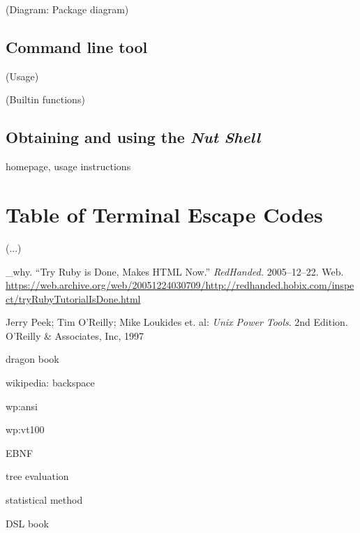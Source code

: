 \documentclass[paper=a4,twoside,abstract=on,cleardoublepage=empty,numbers=noenddot,toc=bib,12pt,appendixprefix=true]{scrreprt}
\begin{document}
(Diagram: Package diagram)

\section{Command line tool}

(Usage)

(Builtin functions)

\section{Obtaining and using the \emph{Nut Shell}}

homepage, usage instructions

\chapter{Table of Terminal Escape Codes}
\label{sec:esc}

(...)

\begin{thebibliography}{99}
        \_why. “Try Ruby is Done, Makes HTML Now.” \emph{RedHanded.} 2005--12--22. Web. \url{https://web.archive.org/web/20051224030709/http://redhanded.hobix.com/inspect/tryRubyTutorialIsDone.html}

    \bibitem{}
        Jerry Peek; Tim O'Reilly; Mike Loukides et. al: \emph{Unix Power Tools}. 2nd Edition. O'Reilly \& Associates, Inc, 1997

    \bibitem{}
        dragon book

    \bibitem{}
        wikipedia: backspace

    \bibitem{}
        wp:ansi

    \bibitem{}
        wp:vt100

    \bibitem{}
        EBNF

    \bibitem{}
        tree evaluation

    \bibitem{}
        statistical method

    \bibitem{}
        DSL book
\end{thebibliography}
\end{document}
